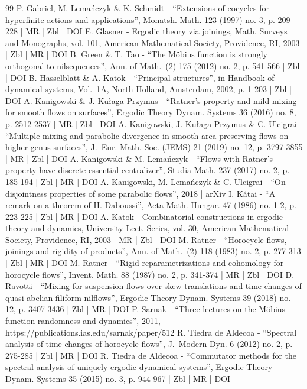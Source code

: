 \begin{thebibliography}{99}
P. Gabriel, M. Lemańczyk \& K. Schmidt - “Extensions of cocycles for hyperfinite actions and applications”, Monatsh. Math. 123 (1997) no. 3, p. 209-228 | MR | Zbl | DOI
E. Glasner - Ergodic theory via joinings, Math. Surveys and Monographs, vol. 101, American Mathematical Society, Providence, RI, 2003 | Zbl | MR | DOI
B. Green \& T. Tao - “The Möbius function is strongly orthogonal to nilsequences”, Ann. of Math. (2) 175 (2012) no. 2, p. 541-566 | Zbl | DOI
B. Hasselblatt \& A. Katok - “Principal structures”, in Handbook of dynamical systems, Vol. 1A, North-Holland, Amsterdam, 2002, p. 1-203 | Zbl | DOI
A. Kanigowski \& J. Kułaga-Przymus - “Ratner’s property and mild mixing for smooth flows on surfaces”, Ergodic Theory Dynam. Systems 36 (2016) no. 8, p. 2512-2537 | MR | Zbl | DOI
A. Kanigowski, J. Kułaga-Przymus \& C. Ulcigrai - “Multiple mixing and parabolic divergence in smooth area-preserving flows on higher genus surfaces”, J. Eur. Math. Soc. (JEMS) 21 (2019) no. 12, p. 3797-3855 | MR | Zbl | DOI
A. Kanigowski \& M. Lemańczyk - “Flows with Ratner’s property have discrete essential centralizer”, Studia Math. 237 (2017) no. 2, p. 185-194 | Zbl | MR | DOI
A. Kanigowski, M. Lemańczyk \& C. Ulcigrai - “On disjointness properties of some parabolic flows”, 2018 | arXiv
I. Kátai - “A remark on a theorem of H. Daboussi”, Acta Math. Hungar. 47 (1986) no. 1-2, p. 223-225 | Zbl | MR | DOI
A. Katok - Combinatorial constructions in ergodic theory and dynamics, University Lect. Series, vol. 30, American Mathematical Society, Providence, RI, 2003 | MR | Zbl | DOI
M. Ratner - “Horocycle flows, joinings and rigidity of products”, Ann. of Math. (2) 118 (1983) no. 2, p. 277-313 | Zbl | MR | DOI
M. Ratner - “Rigid reparametrizations and cohomology for horocycle flows”, Invent. Math. 88 (1987) no. 2, p. 341-374 | MR | Zbl | DOI
D. Ravotti - “Mixing for suspension flows over skew-translations and time-changes of quasi-abelian filiform nilflows”, Ergodic Theory Dynam. Systems 39 (2018) no. 12, p. 3407-3436 | Zbl | MR | DOI
P. Sarnak - “Three lectures on the Möbius function randomness and dynamics”, 2011, https://publications.ias.edu/sarnak/paper/512
R. Tiedra de Aldecoa - “Spectral analysis of time changes of horocycle flows”, J. Modern Dyn. 6 (2012) no. 2, p. 275-285 | Zbl | MR | DOI
R. Tiedra de Aldecoa - “Commutator methods for the spectral analysis of uniquely ergodic dynamical systems”, Ergodic Theory Dynam. Systems 35 (2015) no. 3, p. 944-967 | Zbl | MR | DOI
\end{thebibliography}
